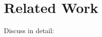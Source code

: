 \section{Related Work}
\label{sec:relate}

\begin{comment}
* Applications of perturbations
** As augmentation
- ICLR paper
- contrast set
- other two papers

** As explanation
- Perturbation

* Text generation
- Controlled style transfer
- Special tokens, finetuning gpt-2
- blank

\end{comment}

Discuss in detail:

\cite{li2020linguistically}

